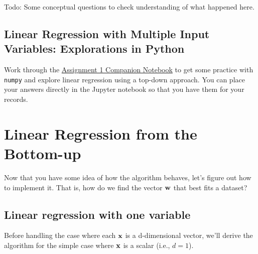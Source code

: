 \documentclass[assignment01_Solutions]{subfiles}
\begin{document}

\begin{exercise}
Todo: Some conceptual questions to check understanding of what happened here.
\end{exercise}



\subsection{Linear Regression with Multiple Input Variables: Explorations in Python}
Work through the \href{https://colab.research.google.com/drive/12pLbQkhrPoI-22FVV6gZNObi1IJCW-mF}{Assignment 1 Companion Notebook} to get some practice with {\tt numpy} and explore linear regression using a top-down approach.  You can place your answers directly in the Jupyter notebook so that you have them for your records.

\section{Linear Regression from the Bottom-up}

Now that you have some idea of how the algorithm behaves, let's figure out how to implement it.  That is, how do we find the vector $\mathbf{w}$ that best fits a dataset?

\subsection{Linear regression with one variable}

Before handling the case where each $\mathbf{x}$ is a d-dimensional vector, we'll derive the algorithm for the simple case where $\mathbf{x}$ is a scalar (i.e., $d=1$).
\end{document}
